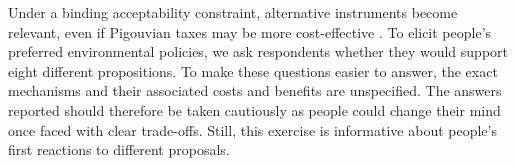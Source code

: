 \documentclass[english,5p,authoryear]{elsarticle}
\begin{document}
Under a binding acceptability constraint, alternative instruments become relevant, even if Pigouvian taxes may be more cost-effective \citep[e.g.][]{goulder_parry_2008}. To elicit people's preferred environmental policies, we ask respondents whether they would support eight different propositions. To make these questions easier to answer, the exact mechanisms and their associated costs and benefits are unspecified. The answers reported should therefore be taken cautiously as people could change their mind once faced with clear trade-offs. Still, this exercise is informative about people's first reactions to different proposals.


\end{document}
